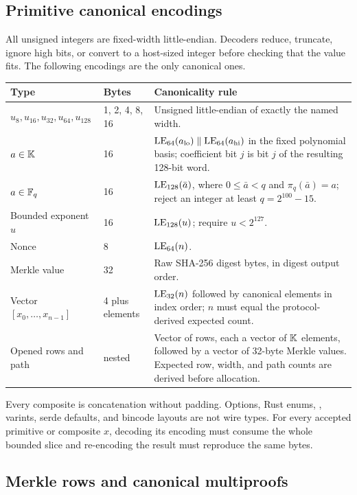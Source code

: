 \subsection{Primitive canonical encodings}
\label{sec:wire-primitives}

All unsigned integers are fixed-width little-endian.  Decoders \mustnot{}
reduce, truncate, ignore high bits, or convert to a host-sized integer before
checking that the value fits.  The following encodings are the only canonical
ones.

\begingroup\footnotesize
\renewcommand{\arraystretch}{1.05}
\begin{tabularx}{\linewidth}{@{}p{1.25in}p{1.35in}X@{}}
\toprule
\textbf{Type}&\textbf{Bytes}&\textbf{Canonicality rule}\\
\midrule
$u_8,u_{16},u_{32},u_{64},u_{128}$&1, 2, 4, 8, 16&Unsigned
little-endian of exactly the named width.\\
$a\in\mathbb K$&16&$\operatorname{LE}_{64}(a_{\mathrm{lo}})\parallel\operatorname{LE}_{64}(a_{\mathrm{hi}})$ in the fixed
polynomial basis; coefficient bit $j$ is bit $j$ of the resulting 128-bit
word.\\
$a\in\mathbb F_q$&16&$\operatorname{LE}_{128}(\bar a)$, where $0\le\bar a<q$ and
$\pi_q(\bar a)=a$; reject an integer at least $q=2^{100}-15$.\\
Bounded exponent $u$&16&$\operatorname{LE}_{128}(u)$; require $u<2^{127}$.\\
Nonce&8&$\operatorname{LE}_{64}(n)$.\\
Merkle value&32&Raw SHA-256 digest bytes, in digest output order.\\
Vector $[x_0,\ldots,x_{n-1}]$&4 plus elements&$\operatorname{LE}_{32}(n)$ followed by
canonical elements in index order; $n$ must equal the protocol-derived expected
count.\\
Opened rows and path&nested&Vector of rows, each a vector of $\mathbb K$ elements,
followed by a vector of 32-byte Merkle values.  Expected row, width, and path
counts are derived before allocation.\\
\bottomrule
\end{tabularx}
\endgroup

Every composite is concatenation without padding.  Options, Rust enums,
, varints, serde defaults, and bincode layouts are not wire types.
For every accepted primitive or composite $x$, decoding its encoding must
consume the whole bounded slice and re-encoding the result must reproduce the
same bytes.

\subsection{Merkle rows and canonical multiproofs}
\label{sec:wire-merkle}

